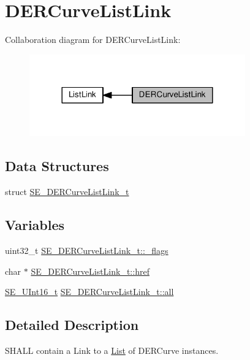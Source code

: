 \hypertarget{group__DERCurveListLink}{}\section{D\+E\+R\+Curve\+List\+Link}
\label{group__DERCurveListLink}
Collaboration diagram for D\+E\+R\+Curve\+List\+Link\+:\nopagebreak
\begin{figure}[H]
\begin{center}
\leavevmode
\includegraphics[width=264pt]{group__DERCurveListLink}
\end{center}
\end{figure}
\subsection*{Data Structures}
\begin{DoxyCompactItemize}
\item 
struct \hyperlink{structSE__DERCurveListLink__t}{S\+E\+\_\+\+D\+E\+R\+Curve\+List\+Link\+\_\+t}
\end{DoxyCompactItemize}
\subsection*{Variables}
\begin{DoxyCompactItemize}
\item 
uint32\+\_\+t \hyperlink{group__DERCurveListLink_gacdf332cf076235a033cec9d50958c3c5}{S\+E\+\_\+\+D\+E\+R\+Curve\+List\+Link\+\_\+t\+::\+\_\+flags}
\item 
char $\ast$ \hyperlink{group__DERCurveListLink_ga78be8068f0ce6e8e040f5d59a71335fc}{S\+E\+\_\+\+D\+E\+R\+Curve\+List\+Link\+\_\+t\+::href}
\item 
\hyperlink{group__UInt16_gac68d541f189538bfd30cfaa712d20d29}{S\+E\+\_\+\+U\+Int16\+\_\+t} \hyperlink{group__DERCurveListLink_gaa089d77a177cf9db75d2c3d09016bd69}{S\+E\+\_\+\+D\+E\+R\+Curve\+List\+Link\+\_\+t\+::all}
\end{DoxyCompactItemize}


\subsection{Detailed Description}
S\+H\+A\+LL contain a Link to a \hyperlink{structList}{List} of D\+E\+R\+Curve instances. 

